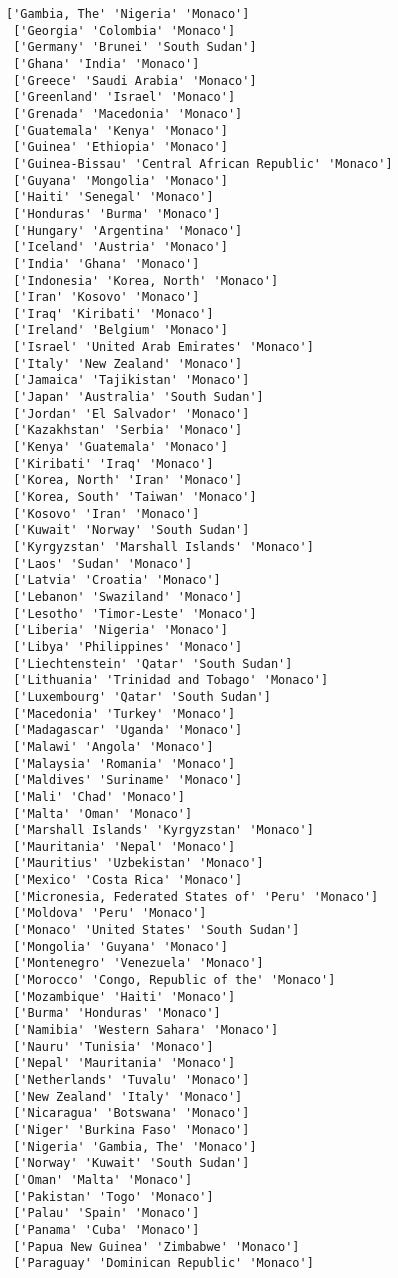 \documentclass[11pt]{article}
\begin{document}
\begin{Verbatim}[commandchars=\\\{\}]
 ['Gambia, The' 'Nigeria' 'Monaco']
 ['Georgia' 'Colombia' 'Monaco']
 ['Germany' 'Brunei' 'South Sudan']
 ['Ghana' 'India' 'Monaco']
 ['Greece' 'Saudi Arabia' 'Monaco']
 ['Greenland' 'Israel' 'Monaco']
 ['Grenada' 'Macedonia' 'Monaco']
 ['Guatemala' 'Kenya' 'Monaco']
 ['Guinea' 'Ethiopia' 'Monaco']
 ['Guinea-Bissau' 'Central African Republic' 'Monaco']
 ['Guyana' 'Mongolia' 'Monaco']
 ['Haiti' 'Senegal' 'Monaco']
 ['Honduras' 'Burma' 'Monaco']
 ['Hungary' 'Argentina' 'Monaco']
 ['Iceland' 'Austria' 'Monaco']
 ['India' 'Ghana' 'Monaco']
 ['Indonesia' 'Korea, North' 'Monaco']
 ['Iran' 'Kosovo' 'Monaco']
 ['Iraq' 'Kiribati' 'Monaco']
 ['Ireland' 'Belgium' 'Monaco']
 ['Israel' 'United Arab Emirates' 'Monaco']
 ['Italy' 'New Zealand' 'Monaco']
 ['Jamaica' 'Tajikistan' 'Monaco']
 ['Japan' 'Australia' 'South Sudan']
 ['Jordan' 'El Salvador' 'Monaco']
 ['Kazakhstan' 'Serbia' 'Monaco']
 ['Kenya' 'Guatemala' 'Monaco']
 ['Kiribati' 'Iraq' 'Monaco']
 ['Korea, North' 'Iran' 'Monaco']
 ['Korea, South' 'Taiwan' 'Monaco']
 ['Kosovo' 'Iran' 'Monaco']
 ['Kuwait' 'Norway' 'South Sudan']
 ['Kyrgyzstan' 'Marshall Islands' 'Monaco']
 ['Laos' 'Sudan' 'Monaco']
 ['Latvia' 'Croatia' 'Monaco']
 ['Lebanon' 'Swaziland' 'Monaco']
 ['Lesotho' 'Timor-Leste' 'Monaco']
 ['Liberia' 'Nigeria' 'Monaco']
 ['Libya' 'Philippines' 'Monaco']
 ['Liechtenstein' 'Qatar' 'South Sudan']
 ['Lithuania' 'Trinidad and Tobago' 'Monaco']
 ['Luxembourg' 'Qatar' 'South Sudan']
 ['Macedonia' 'Turkey' 'Monaco']
 ['Madagascar' 'Uganda' 'Monaco']
 ['Malawi' 'Angola' 'Monaco']
 ['Malaysia' 'Romania' 'Monaco']
 ['Maldives' 'Suriname' 'Monaco']
 ['Mali' 'Chad' 'Monaco']
 ['Malta' 'Oman' 'Monaco']
 ['Marshall Islands' 'Kyrgyzstan' 'Monaco']
 ['Mauritania' 'Nepal' 'Monaco']
 ['Mauritius' 'Uzbekistan' 'Monaco']
 ['Mexico' 'Costa Rica' 'Monaco']
 ['Micronesia, Federated States of' 'Peru' 'Monaco']
 ['Moldova' 'Peru' 'Monaco']
 ['Monaco' 'United States' 'South Sudan']
 ['Mongolia' 'Guyana' 'Monaco']
 ['Montenegro' 'Venezuela' 'Monaco']
 ['Morocco' 'Congo, Republic of the' 'Monaco']
 ['Mozambique' 'Haiti' 'Monaco']
 ['Burma' 'Honduras' 'Monaco']
 ['Namibia' 'Western Sahara' 'Monaco']
 ['Nauru' 'Tunisia' 'Monaco']
 ['Nepal' 'Mauritania' 'Monaco']
 ['Netherlands' 'Tuvalu' 'Monaco']
 ['New Zealand' 'Italy' 'Monaco']
 ['Nicaragua' 'Botswana' 'Monaco']
 ['Niger' 'Burkina Faso' 'Monaco']
 ['Nigeria' 'Gambia, The' 'Monaco']
 ['Norway' 'Kuwait' 'South Sudan']
 ['Oman' 'Malta' 'Monaco']
 ['Pakistan' 'Togo' 'Monaco']
 ['Palau' 'Spain' 'Monaco']
 ['Panama' 'Cuba' 'Monaco']
 ['Papua New Guinea' 'Zimbabwe' 'Monaco']
 ['Paraguay' 'Dominican Republic' 'Monaco']

\end{Verbatim}
\end{document}
